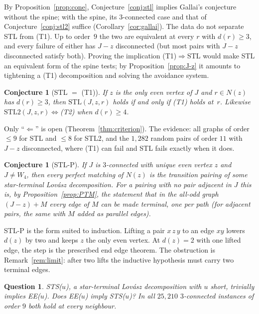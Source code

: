 \documentclass[11pt]{amsart}
\newtheorem{conjecture}[theorem]{Conjecture}
\newtheorem{question}[theorem]{Question}
\theoremstyle{definition}
\newcommand{\STL}{\mathrm{STL}}
\begin{document}
By Proposition~\ref{prop:cone}, Conjecture~\ref{conj:stl} implies Gallai's conjecture without the
spine; with the spine, its $3$-connected case and that of Conjecture~\ref{conj:stl2} suffice
(Corollary~\ref{cor:gallai}). The data do not separate STL from (T1). Up to order~$9$ the two are
equivalent at every $r$ with $d(r)\ge3$, and every failure of either has $J-z$ disconnected
(but most pairs with $J-z$ disconnected satisfy both). Proving the implication
(T1)$\Rightarrow$STL would make STL an equivalent form of the spine tests; by
Proposition~\ref{prop:J-z} it amounts to tightening a (T1) decomposition and solving the avoidance
system.

\begin{conjecture}[STL $=$ (T1)]\label{conj:eq}
If $z$ is the only even vertex of $J$ and $r\in N(z)$ has $d(r)\ge3$, then $\STL(J,z,r)$ holds if
and only if \textup{(T1)} holds at~$r$. Likewise $\STL2(J,z,r)\Leftrightarrow$\textup{(T2)} when
$d(r)\ge4$.
\end{conjecture}
Only ``$\Leftarrow$'' is open (Theorem~\ref{thm:criterion}). The evidence: all graphs of order
$\le9$ for STL and $\le8$ for STL2, and the $1{,}282$ random pairs of order $11$ with $J-z$
disconnected, where (T1) can fail and STL fails exactly when it does.

\begin{conjecture}[STL-P]\label{conj:stlp}
If $J$ is $3$-connected with unique even vertex $z$ and $J\ne W_4$, then every perfect matching of
$N(z)$ is the transition pairing of some star-terminal Lov\'asz decomposition. For a pairing
with no pair adjacent in $J$ this is, by Proposition~\ref{prop:PTM}, the statement that in the
all-odd graph $(J-z)+M$ every edge of $M$ can be made terminal, one per path (for adjacent pairs,
the same with $M$ added as parallel edges).
\end{conjecture}

STL-P is the form suited to induction. Lifting a pair $x\,z\,y$ to an edge $xy$ lowers $d(z)$ by
two and keeps $z$ the only even vertex. At $d(z)=2$ with one lifted edge, the step is the
prescribed end edge theorem. The obstruction is Remark~\ref{rem:limit}: after two lifts the
inductive hypothesis must carry two terminal edges.

\begin{question}
STS($u$), a \emph{star-terminal} Lov\'asz decomposition with $u$ short, trivially implies EE($u$).
Does EE($u$) imply STS($u$)? In all $25{,}210$ $3$-connected instances of order $9$ both hold at
every neighbour.
\end{question}
\end{document}
